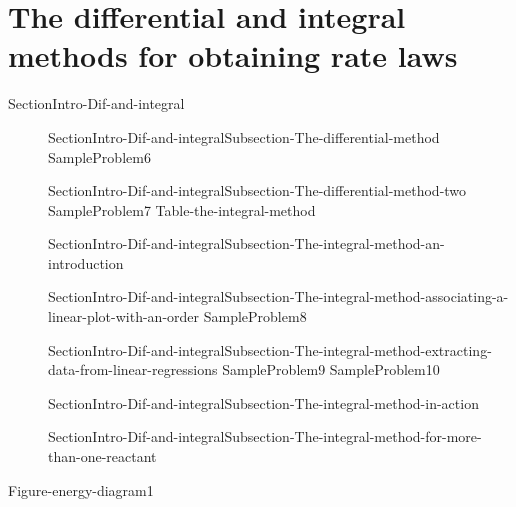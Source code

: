 \documentclass[main.tex]{subfiles}
\newcommand\chapterlabel{Ch-kinetics}\setcounter{figurenewcounter}{0}\setcounter{tablenewcounter}{0}\setcounter{formulanewcounter}{0}\chapterpicture{../{\chapterlabel}/figure1}\chapterpicturelabel{PxFuel}
\begin{document}
\section{The differential and integral methods for obtaining rate laws}{SectionIntro-Dif-and-integral}
\sloppy \begin{description}
\item[] {SectionIntro-Dif-and-integralSubsection-The-differential-method}
  {SampleProblem6}
\item[] {SectionIntro-Dif-and-integralSubsection-The-differential-method-two}
  {SampleProblem7}
  {Table-the-integral-method}
 \item[] {SectionIntro-Dif-and-integralSubsection-The-integral-method-an-introduction}
\item[] {SectionIntro-Dif-and-integralSubsection-The-integral-method-associating-a-linear-plot-with-an-order}
  {SampleProblem8}
\item[] {SectionIntro-Dif-and-integralSubsection-The-integral-method-extracting-data-from-linear-regressions}
  {SampleProblem9}
  {SampleProblem10}
\item[] {SectionIntro-Dif-and-integralSubsection-The-integral-method-in-action}
\item[] {SectionIntro-Dif-and-integralSubsection-The-integral-method-for-more-than-one-reactant}
\end{description}
  {Figure-energy-diagram1}
\end{document}
